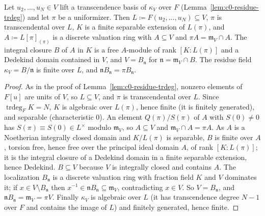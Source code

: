 \begin{lemma}\label{lem:c0-dvr-curve}
\leanok
{}
Let $u_2,\dots,u_N\in V$ lift a transcendence basis of $\kappa_V$ over $F$ (Lemma~\ref{lem:c0-residue-trdeg}) and let $\pi$ be a
uniformizer. Then $L\coloneqq F(u_2,\dots,u_N)\subseteq V$, $\pi$ is transcendental over $L$, $K$ is a finite separable extension of
$L(\pi)$, and $A\coloneqq L[\pi]_{(\pi)}$ is a discrete valuation ring with $A\subseteq V$ and $\pi A=\mathfrak m_V\cap A$. The integral closure
$B$ of $A$ in $K$ is a free $A$-module of rank $[K:L(\pi)]$ and a Dedekind domain contained in $V$, and $V=B_{\mathfrak n}$ for
$\mathfrak n=\mathfrak m_V\cap B$. The residue field $\kappa_V=B/\mathfrak n$ is finite over $L$, and $\mathfrak nB_{\mathfrak n}=\pi B_{\mathfrak n}$.
\end{lemma}

\begin{proof}
As in the proof of Lemma~\ref{lem:c0-residue-trdeg}, nonzero elements of $F[u]$ are units of $V$, so $L\subseteq V$, and $\pi$ is
transcendental over $L$. Since $\operatorname{trdeg}_FK=N$, $K$ is algebraic over $L(\pi)$, hence finite (it is finitely generated), and
separable (characteristic $0$). An element $Q(\pi)/S(\pi)$ of $A$ with $S(0)\ne0$ has $S(\pi)\equiv S(0)\in L^\times$ modulo
$\mathfrak m_V$, so $A\subseteq V$ and $\mathfrak m_V\cap A=\pi A$. As $A$ is a Noetherian integrally closed domain and $K/L(\pi)$ is separable,
$B$ is finite over $A$, torsion free, hence free over the principal ideal domain $A$, of rank $[K:L(\pi)]$; it is the
integral closure of a Dedekind domain in a finite separable extension, hence Dedekind. $B\subseteq V$ because $V$ is integrally
closed and contains $A$. The localization $B_{\mathfrak n}$ is a discrete valuation ring with fraction field $K$ and $V$ dominates
it; if $x\in V\setminus B_{\mathfrak n}$ then $x^{-1}\in\mathfrak nB_{\mathfrak n}\subseteq\mathfrak m_V$, contradicting $x\in V$. So $V=B_{\mathfrak n}$, and
$\mathfrak nB_{\mathfrak n}=\mathfrak m_V=\pi V$. Finally $\kappa_V$ is algebraic over $L$ (it has transcendence degree $N-1$ over $F$ and
contains the image of $L$) and finitely generated, hence finite.
\end{proof}

